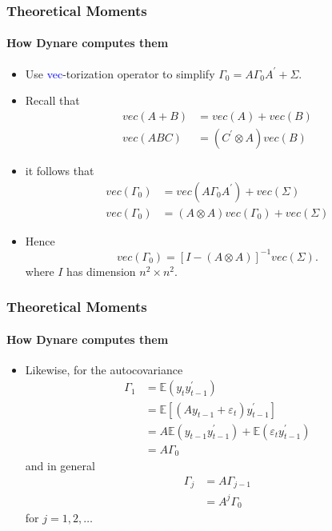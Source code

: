\documentclass{beamer}
\newcommand{\E}{\mathbb{E}}
\begin{document}
\begin{frame}
\frametitle{Theoretical Moments}
\framesubtitle{How Dynare computes them}
\label{kronBack}
\small 
\begin{itemize}
	\item Use \textcolor{blue}{vec}-torization operator to simplify $\Gamma _{0}=A\Gamma _{0}A^{\prime }+\Sigma$.
	\item Recall that
	\begin{align*}
	vec\left( A+B\right) &= vec(A) + vec(B) \\
	vec\left( ABC\right) &=\left( C^{\prime }\otimes A\right) vec\left( B\right)
	\end{align*}
	\item it follows that
	\begin{align*}
	vec\left( \Gamma _{0}\right)  &=vec\left( A\Gamma _{0}A^{\prime }\right)
	+vec\left( \Sigma \right)  \\
	vec\left( \Gamma _{0}\right)  &=\left( A\otimes A\right) vec\left( \Gamma
	_{0}\right) +vec\left( \Sigma \right) 
	\end{align*}
	\item Hence
	\begin{equation*}
	vec\left( \Gamma _{0}\right) =\left[ I-\left( A\otimes A\right) \right]
	^{-1}vec\left( \Sigma \right).
	\end{equation*}%
	where $I$ has dimension $n^{2}\times n^{2}$. \hyperlink{kron}{}
\end{itemize}
\end{frame}

\begin{frame}
\frametitle{Theoretical Moments}
\framesubtitle{How Dynare computes them}
\small 
\begin{itemize}
	\item Likewise, for the autocovariance%
	\begin{align*}
		\Gamma _{1} &=\E\left( y_{t}y_{t-1}^{\prime }\right)  \\
		&=\E\left[ \left( Ay_{t-1}+\varepsilon _{t}\right) y_{t-1}^{\prime }\right] 
		\\
		&=A\E\left( y_{t-1}y_{t-1}^{\prime }\right) +\E\left( \varepsilon
		_{t}y_{t-1}^{\prime }\right)  \\
		&=A\Gamma _{0}
	\end{align*}%
	and in general%
	\begin{align*}
		\Gamma _{j} &=A\Gamma _{j-1} \\
		&=A^{j}\Gamma _{0}
	\end{align*}%
	for $j=1,2,\ldots $
\end{itemize}
\end{frame}
\end{document}

